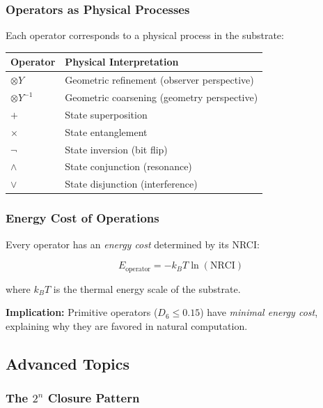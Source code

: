 \subsubsection{Operators as Physical Processes}

Each operator corresponds to a physical process in the substrate:

\begin{table}[h]
\centering
\begin{tabular}{ll}
\toprule
\textbf{Operator} & \textbf{Physical Interpretation} \\
\midrule
$\otimes Y$ & Geometric refinement (observer perspective) \\
$\otimes Y^{-1}$ & Geometric coarsening (geometry perspective) \\
$+$ & State superposition \\
$\times$ & State entanglement \\
$\neg$ & State inversion (bit flip) \\
$\land$ & State conjunction (resonance) \\
$\lor$ & State disjunction (interference) \\
\bottomrule
\end{tabular}
\end{table}

\subsubsection{Energy Cost of Operations}

Every operator has an \emph{energy cost} determined by its NRCI:

\begin{equation}
E_{\text{operator}} = -k_B T \ln(\text{NRCI})
\end{equation}

where $k_B T$ is the thermal energy scale of the substrate.

\textbf{Implication:} Primitive operators ($D_6 \leq 0.15$) have \emph{minimal energy cost}, explaining why they are favored in natural computation.

\subsection{Advanced Topics}

\subsubsection{The $2^n$ Closure Pattern}

